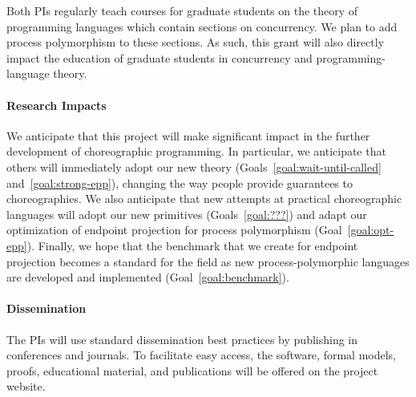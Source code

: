 Both PIs regularly teach courses for graduate students on the theory of programming languages which contain sections on concurrency.
We plan to add process polymorphism to these sections.
As such, this grant will also directly impact the education of graduate students in concurrency and programming-language theory.

\paragraph{Research Impacts}
We anticipate that this project will make significant impact in the further development of choreographic programming.
In particular, we anticipate that others will immediately adopt our new theory (Goals~\ref{goal:wait-until-called} and~\ref{goal:strong-epp}), changing the way people provide guarantees to choreographies.
We also anticipate that new attempts at practical choreographic languages will adopt our new primitives (Goals~\ref{goal:???}) and adapt our optimization of endpoint projection for process polymorphism (Goal~\ref{goal:opt-epp}).
Finally, we hope that the benchmark that we create for endpoint projection becomes a standard for the field as new process-polymorphic languages are developed and implemented (Goal~\ref{goal:benchmark}).

\paragraph{Dissemination}
The PIs will use standard dissemination best practices by publishing in conferences and journals.
To facilitate easy access, the software, formal models, proofs, educational material, and publications will be offered on the project website. 

